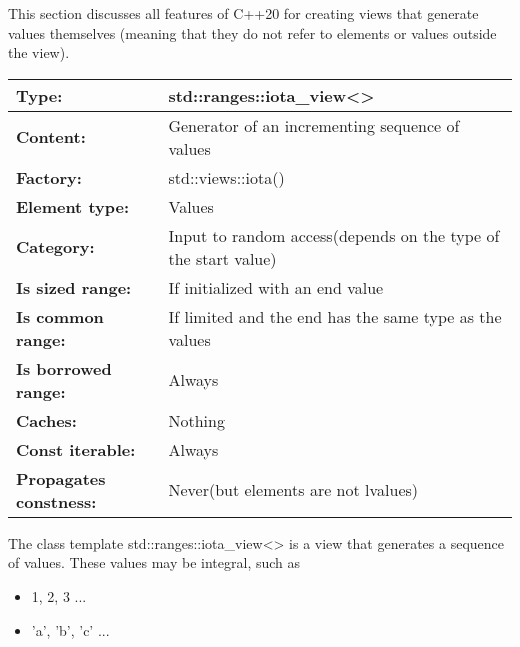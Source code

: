 
This section discusses all features of C++20 for creating views that generate values themselves (meaning that they do not refer to elements or values outside the view).


\begin{longtable}[c]{|l|l|}
\hline
\textbf{Type:}                 & std::ranges::iota\_view\textless{}\textgreater{} \\ \hline
\endfirsthead
%
\endhead
%
\textbf{Content:}              & Generator of an incrementing sequence of values  \\ \hline
\textbf{Factory:}              & std::views::iota()                               \\ \hline
\textbf{Element type:}         & Values                                           \\ \hline
\textbf{Category:}        & Input to random access(depends on the type of the start value) \\ \hline
\textbf{Is sized range:}       & If initialized with an end value                 \\ \hline
\textbf{Is common range:} & If limited and the end has the same type as the values         \\ \hline
\textbf{Is borrowed range:}    & Always                                           \\ \hline
\textbf{Caches:}               & Nothing                                          \\ \hline
\textbf{Const iterable:}       & Always                                           \\ \hline
\textbf{Propagates constness:} & Never(but elements are not lvalues)              \\ \hline
\end{longtable}

The class template std::ranges::iota\_view<> is a view that generates a sequence of values. These values may be integral, such as

\begin{itemize}
\item
1, 2, 3 ...

\item
’a’, ’b’, ’c’ ...
\end{itemize}

